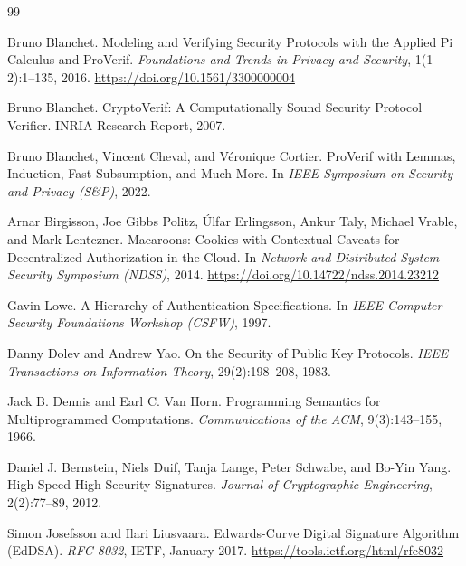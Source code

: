 \documentclass[11pt,a4paper]{article}
\theoremstyle{definition}
\begin{document}

\begin{thebibliography}{99}

Bruno Blanchet.
\newblock Modeling and Verifying Security Protocols with the Applied Pi Calculus and ProVerif.
\newblock \textit{Foundations and Trends in Privacy and Security}, 1(1-2):1--135, 2016.
\newblock \url{https://doi.org/10.1561/3300000004}

Bruno Blanchet.
\newblock CryptoVerif: A Computationally Sound Security Protocol Verifier.
\newblock INRIA Research Report, 2007.

Bruno Blanchet, Vincent Cheval, and Véronique Cortier.
\newblock ProVerif with Lemmas, Induction, Fast Subsumption, and Much More.
\newblock In \textit{IEEE Symposium on Security and Privacy (S\&P)}, 2022.

Arnar Birgisson, Joe Gibbs Politz, Úlfar Erlingsson, Ankur Taly, Michael Vrable, and Mark Lentczner.
\newblock Macaroons: Cookies with Contextual Caveats for Decentralized Authorization in the Cloud.
\newblock In \textit{Network and Distributed System Security Symposium (NDSS)}, 2014.
\newblock \url{https://doi.org/10.14722/ndss.2014.23212}

Gavin Lowe.
\newblock A Hierarchy of Authentication Specifications.
\newblock In \textit{IEEE Computer Security Foundations Workshop (CSFW)}, 1997.

Danny Dolev and Andrew Yao.
\newblock On the Security of Public Key Protocols.
\newblock \textit{IEEE Transactions on Information Theory}, 29(2):198--208, 1983.

Jack B. Dennis and Earl C. Van Horn.
\newblock Programming Semantics for Multiprogrammed Computations.
\newblock \textit{Communications of the ACM}, 9(3):143--155, 1966.

Daniel J. Bernstein, Niels Duif, Tanja Lange, Peter Schwabe, and Bo-Yin Yang.
\newblock High-Speed High-Security Signatures.
\newblock \textit{Journal of Cryptographic Engineering}, 2(2):77--89, 2012.

Simon Josefsson and Ilari Liusvaara.
\newblock Edwards-Curve Digital Signature Algorithm (EdDSA).
\newblock \textit{RFC 8032}, IETF, January 2017.
\newblock \url{https://tools.ietf.org/html/rfc8032}


\end{thebibliography}
\end{document}
